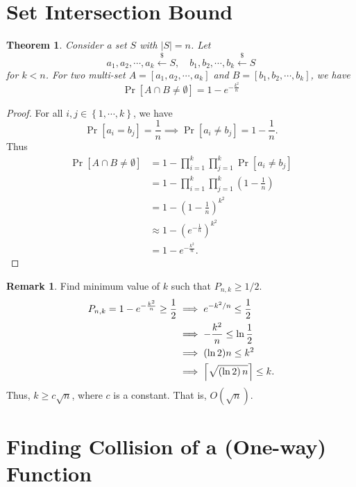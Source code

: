 \documentclass[12pt,openany]{book}
\DeclarePairedDelimiter{\ceil}{\lceil}{\rceil}
\newtheorem{theorem}{Theorem}[chapter]
\theoremstyle{definition}
\newtheorem{remark}{Remark}[chapter]
\newcommand{\set}[1]{\left\{#1\right\}}
\newcommand{\of}[1]{\left( #1 \right)}
\newcommand{\abs}[1]{\left\lvert #1 \right\rvert}
\newcommand{\dollar}{\$}
\newcommand{\uniform}{\xleftarrow{\dollar}}
\begin{document}
	\section{Set Intersection Bound}
	
	\begin{tcolorbox}[colback=white,colframe=thmcolor,arc=5pt,title={\color{white}\bf Set Intersection Bound}]
		\begin{theorem}
			Consider a set $S$ with $\abs{S}=n$. Let \[
			a_1,a_2,\cdots, a_k\uniform S,\quad b_1,b_2,\cdots, b_k\uniform S
			\] for $k<n$. For two multi-set $A=[a_1,a_2,\cdots,a_k]$ and $B=[b_1,b_2,\cdots, b_k]$, we have \[
			\Pr[A\cap B\neq\emptyset]=1-e^{-\frac{k^2}{n}}
			\]
		\end{theorem}
	\end{tcolorbox}
	\begin{proof}
		For all $i,j\in\set{1,\cdots, k}$, we have \[
		\Pr[a_i=b_j]=\frac{1}{n}\implies\Pr[a_i\neq b_j]=1-\frac{1}{n}.
		\] Thus \begin{align*}
		\Pr[A\cap B\neq\emptyset]&=1-\prod_{i=1}^k\prod_{j=1}^k\Pr[a_i\neq b_j]\\
		&=1-\prod_{i=1}^k\prod_{j=1}^k\of{1-\frac{1}{n}}\\
		&=1-\of{1-\frac{1}{n}}^{k^2}\\
		&\approx 1-\of{e^{-\frac{1}{n}}}^{k^2}\\
		&=1-e^{-\frac{k^2}{n}}.
		\end{align*}
	\end{proof}
	
	\begin{remark}
		Find minimum value of $k$ such that $P_{n,k}\geq 1/2$. \begin{align*}
		P_{n,k}=1-e^{-\frac{k^2}{n}}\geq\frac{1}{2}&\implies e^{-k^2/n}\leq\frac{1}{2}\\
		&\implies-\frac{k^2}{n}\leq\ln\frac{1}{2}\\
		&\implies (\ln2)n\leq k^2\\
		&\implies \ceil*{\sqrt{\of{\ln 2}n}}\leq k.
		\end{align*} 
		Thus, $k\geq c\sqrt{n}$, where $c$ is a constant. That is, $O(\sqrt{n})$.
	\end{remark}
	
	\newpage
	\section{Finding Collision of a (One-way) Function}
	
	
	
\end{document}
